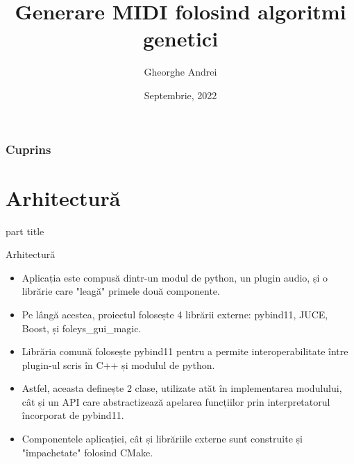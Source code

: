 \documentclass{beamer}
\title{Generare MIDI folosind algoritmi genetici}
\author{Gheorghe Andrei}
\date{Septembrie, 2022}
\begin{document}
\begin{frame}
    \titlepage{}
\end{frame}

\begin{frame}
    \frametitle{Cuprins}
    \tableofcontents
\end{frame}

\section{Arhitectură}

\begin{frame}
    \begin{centering}
        \begin{beamercolorbox}[sep=12pt,center,rounded=true]{part title}
            \insertsection\par
        \end{beamercolorbox}
    \end{centering}
\end{frame}

\begin{frame}{Arhitectură}
\begin{itemize}
    \item Aplicația este compusă dintr-un modul de python, un plugin audio, și o librărie care "leagă" primele două componente.
    \item Pe lângă acestea, proiectul folosește 4 librării externe: pybind11, JUCE, Boost, și foleys\_gui\_magic.
    \item Librăria comună folosește pybind11 pentru a permite interoperabilitate între plugin-ul scris în C++ și modulul de python.
    \item Astfel, aceasta definește 2 clase, utilizate atăt în implementarea modulului, cât și un API care abstractizează apelarea funcțiilor prin interpretatorul încorporat de pybind11.
    \item Componentele aplicației, cât și librăriile externe sunt construite și "împachetate" folosind CMake. 
\end{itemize}
\end{frame}
\end{document}
